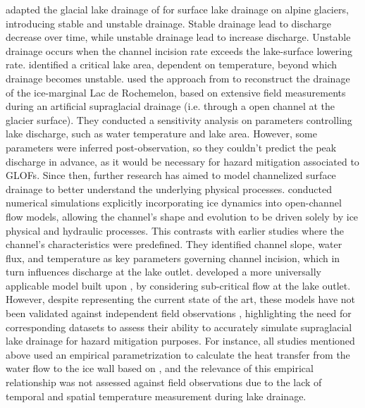 \cite{Raymond&Nolan2000} adapted the glacial lake drainage of \cite{Walder&Costa1996} for surface lake drainage on alpine glaciers, introducing stable and unstable drainage. Stable drainage lead to discharge decrease over time, while unstable drainage lead to increase discharge. Unstable drainage occurs when the channel incision rate exceeds the lake-surface lowering rate. \cite{Raymond&Nolan2000} identified a critical lake area, dependent on temperature, beyond which drainage becomes unstable. \cite{Vincent&al2010} used the approach from \cite{Raymond&Nolan2000} to reconstruct the drainage of the ice-marginal Lac de Rochemelon, based on extensive field measurements during an artificial supraglacial drainage (i.e. through a open channel at the glacier surface). They conducted a sensitivity analysis on parameters controlling lake discharge, such as water temperature and lake area. However, some parameters were inferred post-observation, so they couldn't predict the peak discharge in advance, as it would be necessary for hazard mitigation associated to GLOFs. Since then, further research has aimed to model channelized surface drainage to better understand the underlying physical processes. \cite{Jarosch&Gudmundsson2012} conducted numerical simulations explicitly incorporating ice dynamics into open-channel flow models, allowing the channel's shape and evolution to be driven solely by ice physical and hydraulic processes. This contrasts with earlier studies \citep{Walder&Costa1996, Raymond&Nolan2000} where the channel's characteristics were predefined. They identified channel slope, water flux, and temperature as key parameters governing channel incision, which in turn influences discharge at the lake outlet. \cite{Kingslake&al2015} developed a more universally applicable model built upon \cite{Raymond&Nolan2000}, by considering sub-critical flow at the lake outlet. However, despite representing the current state of the art, these models have not been validated against independent field observations \citep{Pitcher&Smith2019}, highlighting the need for corresponding datasets to assess their ability to accurately simulate supraglacial lake drainage for hazard mitigation purposes. For instance, all studies mentioned above used an empirical parametrization to calculate the heat transfer from the water flow to the ice wall based on \citep[as in][]{Nye1976}, and the relevance of this empirical relationship was not assessed against field observations due to the lack of temporal and spatial temperature measurement during lake drainage. 


